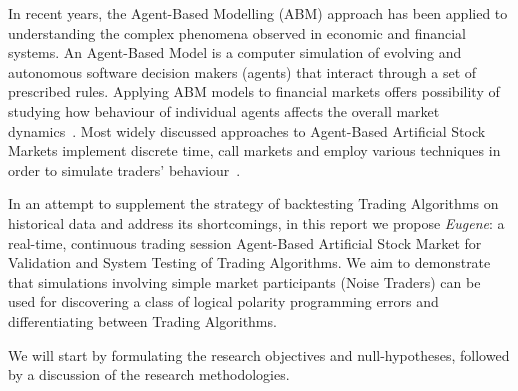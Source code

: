 In recent years, the Agent-Based Modelling (ABM) approach has been applied to understanding the complex phenomena observed in economic and financial systems. An Agent-Based Model is a computer simulation of evolving and autonomous software decision makers (agents) that interact through a set of prescribed rules. Applying ABM models to financial markets offers possibility of studying how behaviour of individual agents affects the overall market dynamics~\citep{Sorban2008, Farmer2009}. Most widely discussed approaches to Agent-Based Artificial Stock Markets implement discrete time, call markets and employ various techniques in order to simulate traders' behaviour~\cite{Jha2010}.

In an attempt to supplement the strategy of backtesting Trading Algorithms on historical data and address its shortcomings, in this report we propose \emph{Eugene}: a real-time, continuous trading session Agent-Based Artificial Stock Market for Validation and System Testing of Trading Algorithms. We aim to demonstrate that simulations involving simple market participants (Noise Traders) can be used for discovering a class of logical polarity programming errors and differentiating between Trading Algorithms.

We will start by formulating the research objectives and null-hypotheses, followed by a discussion of the research methodologies.





